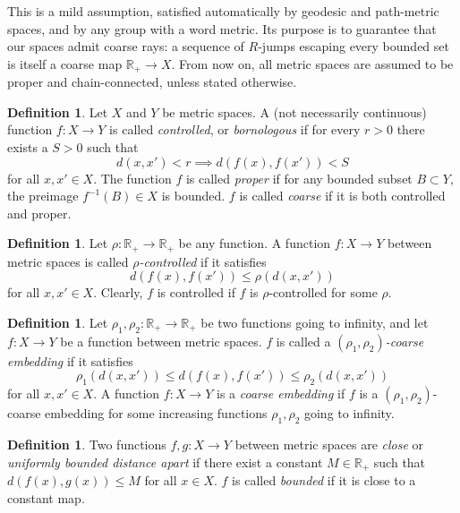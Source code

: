 \documentclass {amsart}
\newcommand {\Rplus}    {\mathbb{R}_{+}}
\theoremstyle {definition}
\newtheorem   {definition}  [theorem] {Definition}
\begin{document}
This is a mild assumption, satisfied automatically by geodesic and path-metric
spaces, and by any group with a word metric. Its purpose is to guarantee that our
spaces admit coarse rays: a sequence of \( R \)-jumps escaping every bounded set
is itself a coarse map \( \Rplus \to X \). From now on, all metric spaces are
assumed to be proper and chain-connected, unless stated otherwise.

\begin{definition}
    Let \( X \) and \( Y \) be metric spaces. A (not necessarily continuous)
    function \( f : X \to Y \) is called \emph{controlled}, or \emph{bornologous}
    if for every \( r>0 \) there exists a
    \( S>0 \) such that
    \[
        d(x,x') < r \implies d(f(x), f(x')) < S
    \]
    for all \( x,x' \in X \). The function \( f \) is called \emph{proper} if for
    any bounded subset \( B \subset Y \), the preimage \( f^{-1} (B) \in X \) is
    bounded. \( f \) is called \emph{coarse} if it is both controlled and proper.
\end{definition}

\begin{definition}
    Let \( \rho : \Rplus \to \Rplus \) be any function. A
    function \( f : X \to Y \) between metric spaces is called \emph{\( \rho
        \)-controlled} if it satisfies
    \[
        d( f(x), f(x') ) \leq \rho (d(x,x'))
    \]
    for all \( x,x' \in X \). Clearly, \( f \) is controlled if
    \( f \) is \( \rho \)-controlled for some \( \rho \).
\end{definition}

\begin{definition} \label{def:coarse-embedding}
    Let \( \rho_1, \rho_2 : \Rplus \to \Rplus \) be two functions going to
    infinity, and let \( f : X \to Y \) be a function between metric spaces. \( f
    \) is called a \emph{\( (\rho_1, \rho_2) \)-coarse embedding} if it satisfies
    \[
        \rho_1 (d(x,x')) \leq d( f(x), f(x') ) \leq \rho_2 ( d(x,x'))
    \]
    for all \( x,x' \in X \). 
    A function \( f: X \to Y \) is a \emph{coarse embedding} if \( f \) is a
    \( (\rho_1, \rho_2) \)-coarse embedding for some increasing functions
    \( \rho_1, \rho_2 \) going to infinity.
\end{definition}

\begin{definition}
    Two functions \( f,g : X \to Y \) between metric spaces are \emph{close} or
    \emph{uniformly bounded distance apart} if there exist a constant \( M \in
    \Rplus \) such that \( d(f(x), g(x)) \leq M \) for all \( x \in X \). \( f \)
    is called \emph{bounded} if it is close to a constant map.
\end{definition}
\end{document}
